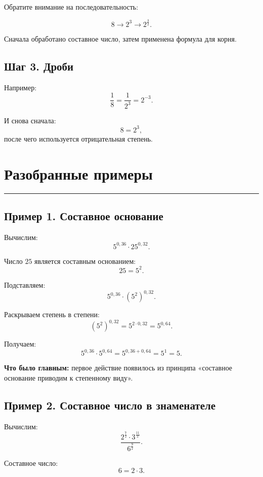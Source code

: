 \documentclass[a4paper,12pt]{article}
\newcommand{\lessonrule}{%
  \par\vspace{0.3em}
  {\color{accent}\rule{\linewidth}{0.6pt}}
  \vspace{0.5em}
}
\newcommand{\important}[1]{\textbf{\color{darkaccent}#1}}
\begin{document}
Обратите внимание на последовательность:

\[
8
\longrightarrow
2^3
\longrightarrow
2^{\frac32}.
\]

Сначала обработано составное число,
затем применена формула для корня.

\subsection*{\color{accent}Шаг 3. Дроби}

Например:
\[
\frac18
=
\frac1{2^3}
=
2^{-3}.
\]

И снова сначала:
\[
8=2^3,
\]
после чего используется отрицательная степень.



\section*{\color{darkaccent}Разобранные примеры}
\lessonrule

\subsection*{\color{accent}Пример 1. Составное основание}

Вычислим:
\[
5^{0,36}\cdot25^{0,32}.
\]

Число \(25\) является составным основанием:
\[
25=5^2.
\]

Подставляем:
\[
5^{0,36}\cdot(5^2)^{0,32}.
\]

Раскрываем степень в степени:
\[
(5^2)^{0,32}
=
5^{2\cdot0,32}
=
5^{0,64}.
\]

Получаем:
\[
5^{0,36}\cdot5^{0,64}
=
5^{0,36+0,64}
=
5^1
=
\boxed{5}.
\]

\important{Что было главным:}
первое действие появилось из принципа
«составное основание приводим к степенному виду».

\subsection*{\color{accent}Пример 2. Составное число в знаменателе}

Вычислим:
\[
\frac{2^{\frac72}\cdot3^{\frac{11}{2}}}
     {6^{\frac92}}.
\]

Составное число:
\[
6=2\cdot3.
\]
\end{document}
